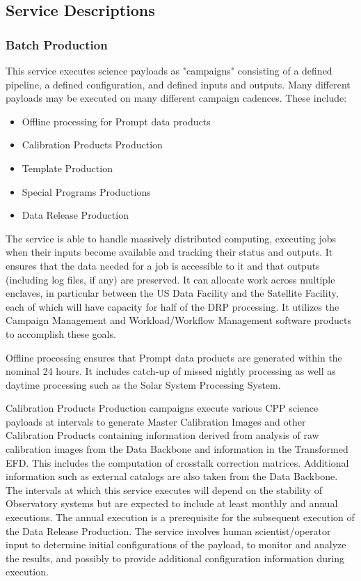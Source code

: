 \documentclass[DM,toc,lsstdraft]{lsstdoc}
\begin{document}
\subsection{Service Descriptions}\label{us-gen-prod-service-descriptions}

\subsubsection{Batch Production}\label{batch-production}

This service executes science payloads as "campaigns" consisting of a defined pipeline, a defined configuration, and defined inputs and outputs.
Many different payloads may be executed on many different campaign cadences.
These include:
\begin{itemize}
	\item Offline processing for Prompt data products
	\item Calibration Products Production
	\item Template Production
	\item Special Programs Productions
	\item Data Release Production
\end{itemize}

The service is able to handle massively distributed computing, executing jobs when their inputs become available and tracking their status and outputs.
It ensures that the data needed for a job is accessible to it and that outputs (including log files, if any) are preserved.
It can allocate work across multiple enclaves, in particular between the US Data Facility and the Satellite Facility, each of which will have capacity for half of the DRP processing.
It utilizes the Campaign Management and Workload/Workflow Management software products to accomplish these goals.

Offline processing ensures that Prompt data products are generated within the nominal 24 hours.
It includes catch-up of missed nightly processing as well as daytime processing such as the Solar System Processing System.

Calibration Products Production campaigns execute various CPP science payloads at intervals to
generate Master Calibration Images and other Calibration Products
containing information derived from analysis of raw calibration images from
the Data Backbone and information in the Transformed EFD. This includes
the computation of crosstalk correction matrices.
Additional information such as external catalogs are also
taken from the Data Backbone. The intervals at which this service
executes will depend on the stability of Observatory systems but are
expected to include at least monthly and annual executions. The annual
execution is a prerequisite for the subsequent execution of the Data
Release Production. The service involves human scientist/operator input
to determine initial configurations of the payload, to monitor and
analyze the results, and possibly to provide additional configuration
information during execution.
\end{document}
